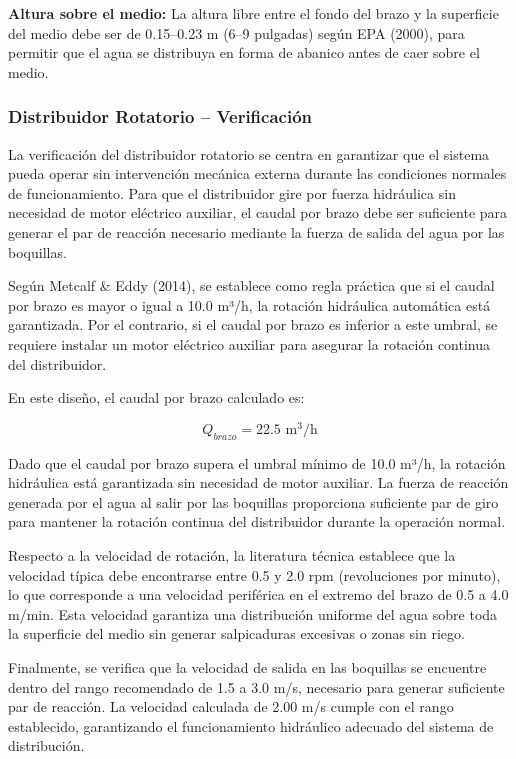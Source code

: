 \documentclass[12pt,a4paper]{article}
\begin{document}
\textbf{Altura sobre el medio:} La altura libre entre el fondo del brazo y la superficie del medio debe ser de 0.15--0.23 m (6--9 pulgadas) según EPA (2000), para permitir que el agua se distribuya en forma de abanico antes de caer sobre el medio.

\subsubsection{Distribuidor Rotatorio -- Verificación}

La verificación del distribuidor rotatorio se centra en garantizar que el sistema pueda operar sin intervención mecánica externa durante las condiciones normales de funcionamiento. Para que el distribuidor gire por fuerza hidráulica sin necesidad de motor eléctrico auxiliar, el caudal por brazo debe ser suficiente para generar el par de reacción necesario mediante la fuerza de salida del agua por las boquillas.

Según Metcalf \& Eddy (2014), se establece como regla práctica que si el caudal por brazo es mayor o igual a 10.0 m³/h, la rotación hidráulica automática está garantizada. Por el contrario, si el caudal por brazo es inferior a este umbral, se requiere instalar un motor eléctrico auxiliar para asegurar la rotación continua del distribuidor.

En este diseño, el caudal por brazo calculado es:

\begin{equation}
Q_{brazo} = 22.5 \text{ m}^3\text{/h}
\end{equation}

Dado que el caudal por brazo supera el umbral mínimo de 10.0 m³/h, la rotación hidráulica está garantizada sin necesidad de motor auxiliar. La fuerza de reacción generada por el agua al salir por las boquillas proporciona suficiente par de giro para mantener la rotación continua del distribuidor durante la operación normal.

Respecto a la velocidad de rotación, la literatura técnica establece que la velocidad típica debe encontrarse entre 0.5 y 2.0 rpm (revoluciones por minuto), lo que corresponde a una velocidad periférica en el extremo del brazo de 0.5 a 4.0 m/min. Esta velocidad garantiza una distribución uniforme del agua sobre toda la superficie del medio sin generar salpicaduras excesivas o zonas sin riego.

Finalmente, se verifica que la velocidad de salida en las boquillas se encuentre dentro del rango recomendado de 1.5 a 3.0 m/s, necesario para generar suficiente par de reacción. La velocidad calculada de 2.00 m/s cumple con el rango establecido, garantizando el funcionamiento hidráulico adecuado del sistema de distribución.
\end{document}
